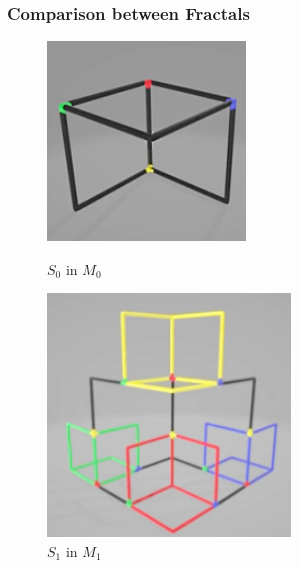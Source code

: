 \begin{frame}
	\frametitle{Comparison between Fractals} %
	\begin{figure}[!htb]
		\begin{minipage}{0.48\textwidth}
			\centering
			\includegraphics[width=.7\linewidth]{images/Comparison1}
			\caption{$S_0$ in $M_0$}\label{Fig:Data1}
		\end{minipage}\hfill
		\begin{minipage}{0.48\textwidth}
			\centering
			\includegraphics[width=.7\linewidth]{images/Comparison2}
			\caption{$S_1$ in $M_1$}\label{Fig:Data2}
		\end{minipage}
	\end{figure}
\end{frame}